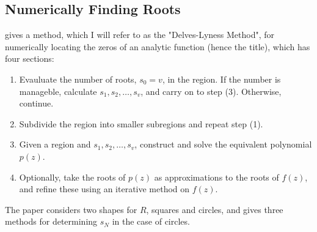 \documentclass{article}
\begin{document}
\subsection{Numerically Finding Roots}

\cite{delves1967numerical} gives a method, which I will refer to as the "Delves-Lyness Method", for numerically locating the zeros of an analytic function (hence the title),
which has four sections:
\begin{enumerate}
	\item Evauluate the number of roots, $s_0=v$, in the region.
	If the number is manageble, calculate $s_1,s_2,\dots,s_v$, and carry on to step (3).
	Otherwise, continue.
	\item
	Subdivide the region into smaller subregions and repeat step (1).
	\item Given a region and $s_1,s_2,\dots,s_v$, construct and solve the equivalent polynomial $p(z)$.
	\item Optionally, take the roots of $p(z)$ as approximations to the roots of $f(z)$,
	and refine these using an iterative method on $f(z)$.
\end{enumerate}
The paper considers two shapes for $R$, squares and circles, 
and  gives three methods for determining $s_N$ in the case of circles.



\printbibliography
\end{document}
